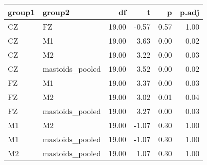 \begin{table}[ht]
\centering
\begin{tabulary}{\textwidth}{llrrrr}
  \toprule
group1 & group2 & df & t & p & p.adj \\ 
  \midrule
CZ & FZ & 19.00 & -0.57 & 0.57 & 1.00 \\ 
  CZ & M1 & 19.00 & 3.63 & 0.00 & 0.02 \\ 
  CZ & M2 & 19.00 & 3.22 & 0.00 & 0.03 \\ 
  CZ & mastoids\_pooled & 19.00 & 3.52 & 0.00 & 0.02 \\ 
  FZ & M1 & 19.00 & 3.37 & 0.00 & 0.03 \\ 
  FZ & M2 & 19.00 & 3.02 & 0.01 & 0.04 \\ 
  FZ & mastoids\_pooled & 19.00 & 3.27 & 0.00 & 0.03 \\ 
  M1 & M2 & 19.00 & -1.07 & 0.30 & 1.00 \\ 
  M1 & mastoids\_pooled & 19.00 & -1.07 & 0.30 & 1.00 \\ 
  M2 & mastoids\_pooled & 19.00 & 1.07 & 0.30 & 1.00 \\ 
   \bottomrule
\end{tabulary}
\end{table}
